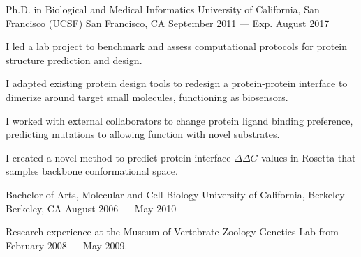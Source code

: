 

\begin{cventries}

  \cventry
  {Ph.D. in Biological and Medical Informatics} %
  {University of California, San Francisco (UCSF)} %
  {San Francisco, CA} %
  {September 2011 --- Exp. August 2017} %
  {
    \begin{cvitems} %
    \item I led a lab project to benchmark and assess computational protocols for protein structure prediction and design.
    \item I adapted existing protein design tools to redesign a
      protein-protein interface to dimerize around target small molecules, functioning
      as biosensors.
    \item I worked with external collaborators to change protein ligand binding preference, predicting mutations to allowing function with novel substrates.
    \item I created a novel method to predict protein interface $\Delta\Delta G$ values in Rosetta that samples backbone conformational space.
    \end{cvitems}
  }

  \cventry
  {Bachelor of Arts, Molecular and Cell Biology} %
  {University of California, Berkeley} %
  {Berkeley, CA} %
  {August 2006 --- May 2010} %
  {
    \begin{cvitems} %
    \item Research experience at the Museum of Vertebrate Zoology Genetics Lab from February 2008 --- May 2009.
    \end{cvitems}
  }

\end{cventries}
